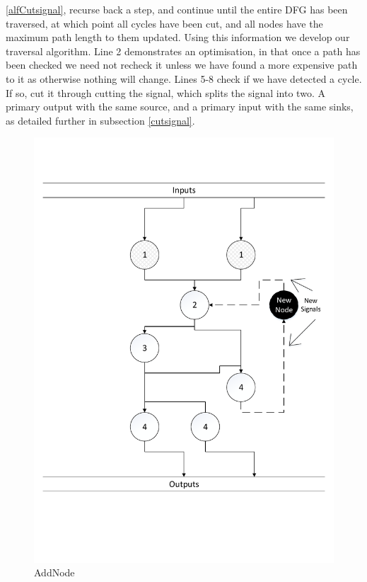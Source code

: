\documentclass[12pt,final,oneside]{dwThesis} %
\begin{document}
      \ref{alfCutsignal}, recurse back a step,
      and continue until the entire \gls{DFG} has been traversed, at which
      point all cycles have been cut, and all nodes have the maximum path
      length to them updated.  Using this information we develop our traversal
      algorithm.  Line 2 demonstrates an optimisation, in that once a path has
      been checked we need not recheck it unless we have found a more expensive
      path to it as otherwise nothing will change.  Lines 5-8 check if we have
      detected a cycle. If so, cut it through cutting the signal, which splits
      the signal into two. A primary output with the same source, and a primary
      input with the same sinks, as detailed further in subsection
      \ref{cutsignal}.

   \begin{figure} \begin{center}
         \includegraphics[width=\linewidth]{images/UpdateCostsAndBreakCycles.pdf}
         \caption{AddNode} \label{imAddnode} \end{center} \end{figure}
\end{document}
